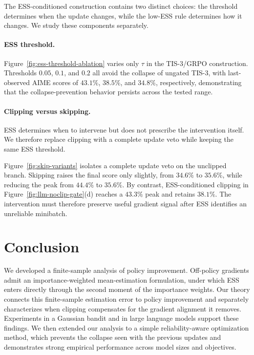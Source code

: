 \documentclass[11pt]{article}
\theoremstyle{remark}
\begin{document}
The ESS-conditioned construction contains two distinct choices: the threshold
determines when the update changes, while the low-ESS rule determines how it changes. We study these components separately.

\paragraph{ESS threshold.}
Figure~\ref{fig:ess-threshold-ablation} varies only $\tau$ in the TIS-3/GRPO construction. Thresholds $0.05$, $0.1$, and $0.2$ all avoid the collapse of ungated TIS-3, with last-observed AIME scores of $43.1\%$,
$38.5\%$, and $34.8\%$, respectively, demonstrating that the collapse-prevention behavior persists across the tested range.

\paragraph{Clipping versus skipping.}
ESS determines when to intervene but does not prescribe the intervention itself. We therefore replace clipping with a complete update veto while keeping the same ESS threshold.

Figure~\ref{fig:skip-variants} isolates a complete update veto on the unclipped branch. Skipping raises the final score only slightly, from $34.6\%$
to $35.6\%$, while reducing the peak from $44.4\%$ to $35.6\%$. By contrast,
ESS-conditioned clipping in Figure~\ref{fig:llm-noclip-gate}(d) reaches a
$43.3\%$ peak and retains $38.1\%$. The intervention must therefore preserve
useful gradient signal after ESS identifies an unreliable minibatch.




\section{Conclusion}

We developed a finite-sample analysis of policy improvement. Off-policy gradients admit an importance-weighted mean-estimation formulation, under which ESS enters directly through the second moment of the importance weights. Our theory connects this finite-sample estimation error to policy improvement and separately characterizes when clipping compensates for the gradient alignment it removes. Experiments in a Gaussian bandit and in large language models support these findings. We then extended our analysis to a simple reliability-aware optimization method, which prevents the collapse seen with the previous updates and demonstrates strong empirical performance across model sizes and objectives.
\end{document}
